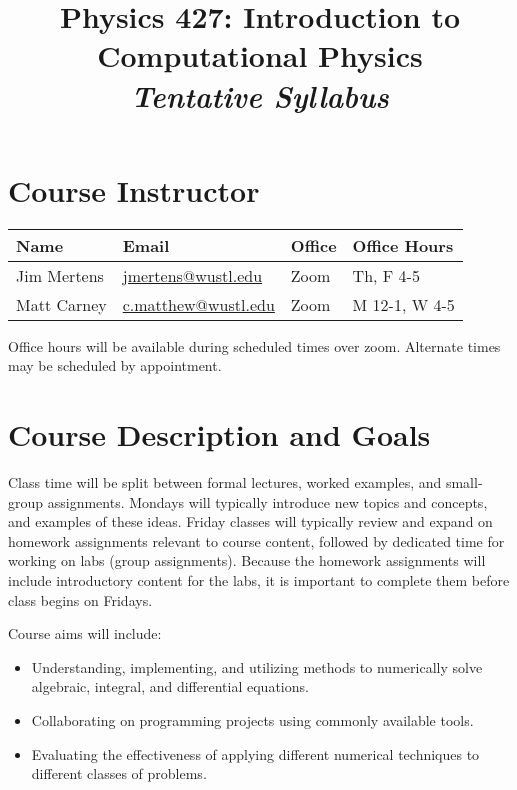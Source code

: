 \documentclass[11pt]{article}
\begin{document}
\title{Physics 427: Introduction to Computational Physics \\ {\em Tentative Syllabus}}
\date{}
\maketitle


\section*{Course Instructor}

\begin{tabularx}{1.0\textwidth}{
  >{\centering\arraybackslash}X
  >{\centering\arraybackslash}X
  >{\centering\arraybackslash}X
  >{\centering\arraybackslash}X
}
 Name & Email & Office & Office Hours \\
 \hline
 Jim Mertens & \href{mailto:jmertens@wustl.edu}{jmertens@wustl.edu} & Zoom & Th, F 4-5 \\
 Matt Carney & \href{mailto:c.matthew@wustl.edu}{c.matthew@wustl.edu} & Zoom & M 12-1, W 4-5 \\
\end{tabularx}

\vspace{0.2em}

Office hours will be available during scheduled times over zoom.
Alternate times may be scheduled by appointment.

\section*{Course Description and Goals}

Class time will be split between formal lectures, worked examples, and small-group assignments.
Mondays will typically introduce new topics and concepts, and examples of these ideas.
Friday classes will typically review and expand on homework assignments relevant to course content,
followed by dedicated time for working on labs (group assignments). Because the homework assignments
will include introductory content for the labs, it is important to complete them before class begins
on Fridays.

Course aims will include:
\begin{itemize}
  \setlength\itemsep{-0.0em}
  \item Understanding, implementing, and utilizing methods to numerically solve algebraic, integral, and differential equations.
  \item Collaborating on programming projects using commonly available tools.
  \item Evaluating the effectiveness of applying different numerical techniques to different classes of problems.
\end{itemize}
\end{document}
